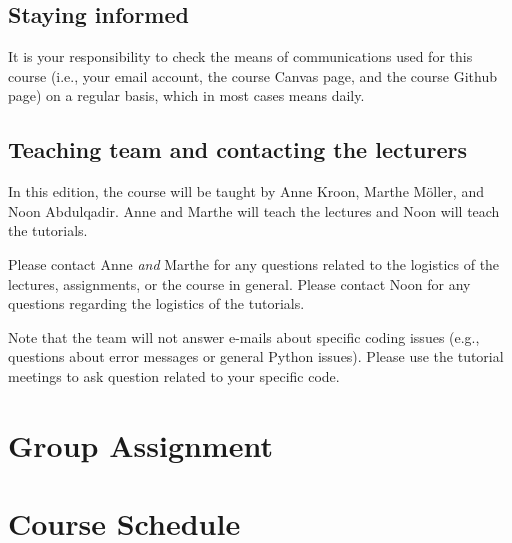 \documentclass[a4paper,10pt,twocolumn]{report}
\begin{document}
	\section{Staying informed}
	It is your responsibility to check the means of communications used for this course (i.e., your email account, the course Canvas page, and the course Github page) on a regular basis, which in most cases means daily. 
	
	\section{Teaching team and contacting the lecturers}
	In this edition, the course will be taught by Anne Kroon, Marthe Möller, and Noon Abdulqadir. Anne and Marthe will teach the lectures and Noon will teach the tutorials.
	
	Please contact Anne \emph{and} Marthe for any questions related to the logistics of the lectures, assignments, or the course in general.
	Please contact Noon for any questions regarding the logistics of the tutorials. 
	
	Note that the team will not answer e-mails about specific coding issues (e.g., questions about error messages or general Python issues). Please use the tutorial meetings to ask question related to your specific code.
	

	\chapter{Group Assignment}
	\label{sec:groupassignment}
	
	
	
	\chapter{Course Schedule}
	
	
	
	
	
	

	
\end{document}
